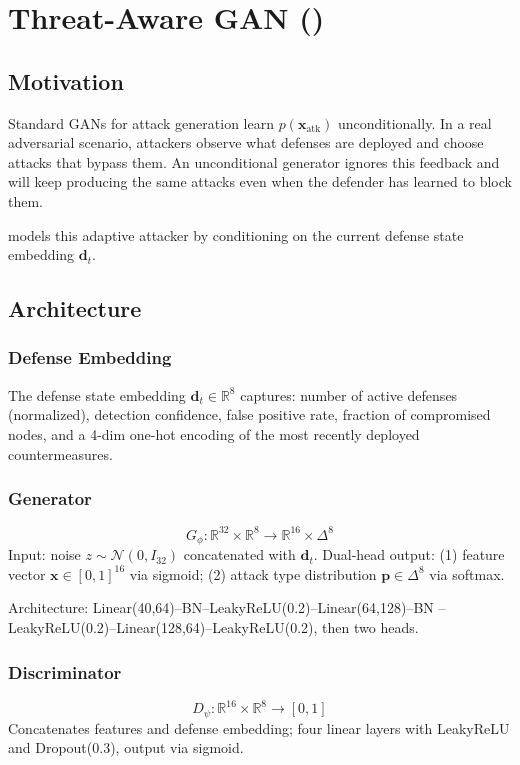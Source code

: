 \chapter{Threat-Aware GAN (\tagan{})}
\label{ch:tagan}

\section{Motivation}

Standard GANs for attack generation learn $p(\mathbf{x}_{\mathrm{atk}})$
unconditionally. In a real adversarial scenario, attackers observe what
defenses are deployed and choose attacks that bypass them. An unconditional
generator ignores this feedback and will keep producing the same attacks
even when the defender has learned to block them.

\tagan{} models this adaptive attacker by conditioning on the current
defense state embedding $\mathbf{d}_t$.

\section{Architecture}

\subsection{Defense Embedding}
The defense state embedding $\mathbf{d}_t \in \mathbb{R}^8$ captures:
number of active defenses (normalized), detection confidence, false
positive rate, fraction of compromised nodes, and a 4-dim one-hot
encoding of the most recently deployed countermeasures.

\subsection{Generator}
\begin{equation}
  G_\phi : \mathbb{R}^{32} \times \mathbb{R}^8 \to \mathbb{R}^{16} \times \Delta^8
\end{equation}
Input: noise $z \sim \mathcal{N}(0,I_{32})$ concatenated with $\mathbf{d}_t$.
Dual-head output: (1) feature vector $\mathbf{x} \in [0,1]^{16}$ via
sigmoid; (2) attack type distribution $\mathbf{p} \in \Delta^8$ via softmax.

Architecture: Linear(40,64)--BN--LeakyReLU(0.2)--Linear(64,128)--BN
--LeakyReLU(0.2)--Linear(128,64)--LeakyReLU(0.2), then two heads.

\subsection{Discriminator}
\begin{equation}
  D_\psi : \mathbb{R}^{16} \times \mathbb{R}^8 \to [0,1]
\end{equation}
Concatenates features and defense embedding; four linear layers with
LeakyReLU and Dropout(0.3), output via sigmoid.


